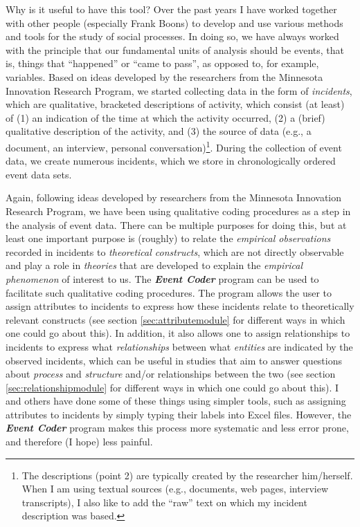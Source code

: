 \documentclass{memoir}
\begin{document}
Why is it useful to have this tool? Over the past years I have worked together with other people (especially Frank Boons) to develop and use various methods and tools for the study of social processes. In doing so, we have always worked with the principle that our fundamental units of analysis should be events, that is, things that ``happened'' or ``came to pass'', as opposed to, for example, variables. Based on ideas developed by the researchers from the Minnesota Innovation Research Program, we started collecting data in the form of \emph{incidents}, which are qualitative, bracketed descriptions of activity, which consist (at least) of (1) an indication of the time at which the activity occurred, (2) a (brief) qualitative description of the activity, and (3) the source of data (e.g., a document, an interview, personal conversation)\footnote{The descriptions (point 2) are typically created by the researcher him/herself. When I am using textual sources (e.g., documents, web pages, interview transcripts), I also like to add the ``raw'' text on which my incident description was based.}. During the collection of event data, we create numerous incidents, which we store in chronologically ordered event data sets.

Again, following ideas developed by researchers from the Minnesota Innovation Research Program, we have been using qualitative coding procedures as a step in the analysis of event data. There can be multiple purposes for doing this, but at least one important purpose is (roughly) to relate the \emph{empirical observations} recorded in incidents to \emph{theoretical constructs}, which are not directly observable and  play a role in \emph{theories} that are developed to explain the \emph{empirical phenomenon} of interest to us. The \textbf{\emph{Event Coder}} program can be used to facilitate such qualitative coding procedures. The program allows the user to assign attributes to incidents to express how these incidents relate to theoretically relevant constructs (see section \ref{sec:attributemodule} for different ways in which one could go about this). In addition, it also allows one to assign relationships to incidents to express what \emph{relationships} between what \emph{entities} are indicated by the observed incidents, which can be useful in studies that aim to answer questions about \emph{process} and \emph{structure} and/or relationships between the two (see section \ref{sec:relationshipmodule} for different ways in which one could go about this). I and others have done some of these things using simpler tools, such as assigning attributes to incidents by simply typing their labels into Excel files. However, the \textbf{\emph{Event Coder}} program makes this process more systematic and less error prone, and therefore (I hope) less painful.
\end{document}
